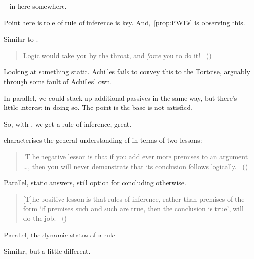 \begin{note}
  \color{red}

  ~\cite{Besson:2018wz} in here somewhere.
\end{note}

\begin{note}
  \color{red}
  Point here is role of rule of inference is key.
  And,~\autoref{prop:PWEs} is observing this.
\end{note}

\begin{note}
  Similar to \citeauthor{Carroll:1895uj}.
  \begin{quote}
    Logic would take you by the throat, and \emph{force} you to do it!%
    \mbox{ }\hfill\mbox{(\citeyear[280]{Carroll:1895uj})}
  \end{quote}
  Looking at something static.
  Achilles fails to convey this to the Tortoise, arguably through some fault of Achilles' own.

  In parallel, we could stack up additional passives in the same way, but there's little interest in doing so.
  The point is the base \requ{} is not satisfied.
\end{note}

\begin{note}
  So, with \citeauthor{Carroll:1895uj}, we get a rule of inference, great.

  \citeauthor{Wieland:2013vf} characterises the general understanding of \textcite{Carroll:1895uj} in terms of two lessons:
  \begin{quote}
    [T]he negative lesson is that if you add ever more premises to an argument \dots, then you will never demonstrate that its conclusion follows logically.%
    \mbox{ }\hfill\mbox{(\citeyear[984]{Wieland:2013vf})}
  \end{quote}

  Parallel, static answers, still option for concluding otherwise.

  \begin{quote}
    [T]he positive lesson is that rules of inference, rather than premises of the form `if premises such and such are true, then the conclusion is true', will do the job.%
    \mbox{ }\hfill\mbox{(\citeyear[984]{Wieland:2013vf})}
  \end{quote}

  Parallel, the dynamic status of a rule.
\end{note}

\begin{note}
  Similar, but a little different.
\end{note}

